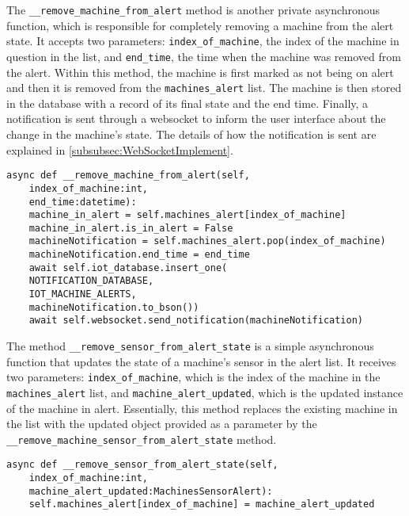 The \texttt{\_\_remove\_machine\_from\_alert} method is another private asynchronous function, which is responsible for completely removing a machine from the alert state. It accepts two parameters: \texttt{index\_of\_machine}, the index of the machine in question in the list, and \texttt{end\_time}, the time when the machine was removed from the alert. Within this method, the machine is first marked as not being on alert and then it is removed from the \texttt{machines\_alert} list. The machine is then stored in the database with a record of its final state and the end time. Finally, a notification is sent through a websocket to inform the user interface about the change in the machine's state. The details of how the notification is sent are explained in \ref{subsubsec:WebSocketImplement}.

\begin{verbatim}
async def __remove_machine_from_alert(self,
    index_of_machine:int,
    end_time:datetime):
    machine_in_alert = self.machines_alert[index_of_machine]
    machine_in_alert.is_in_alert = False
    machineNotification = self.machines_alert.pop(index_of_machine)
    machineNotification.end_time = end_time
    await self.iot_database.insert_one(
    NOTIFICATION_DATABASE,
    IOT_MACHINE_ALERTS,
    machineNotification.to_bson())
    await self.websocket.send_notification(machineNotification)    
\end{verbatim}

The method \texttt{\_\_remove\_sensor\_from\_alert\_state} is a simple asynchronous function that updates the state of a machine's sensor in the alert list. It receives two parameters: \texttt{index\_of\_machine}, which is the index of the machine in the \texttt{machines\_alert} list, and \texttt{machine\_alert\_updated}, which is the updated instance of the machine in alert. Essentially, this method replaces the existing machine in the list with the updated object provided as a parameter by the \texttt{\_\_remove\_machine\_sensor\_from\_alert\_state} method.

\begin{verbatim}
async def __remove_sensor_from_alert_state(self,
    index_of_machine:int,
    machine_alert_updated:MachinesSensorAlert):
    self.machines_alert[index_of_machine] = machine_alert_updated
\end{verbatim}